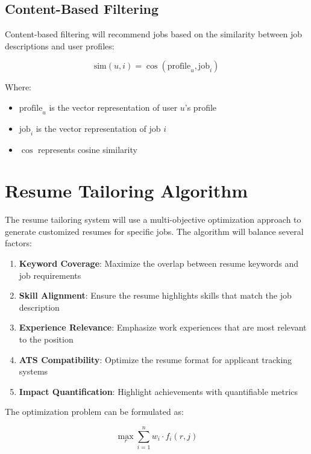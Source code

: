 \documentclass[12pt,a4paper]{report}
\begin{document}
\subsection*{Content-Based Filtering}

Content-based filtering will recommend jobs based on the similarity between job descriptions and user profiles:

\begin{equation}
    \text{sim}(u,i) = \cos(\text{profile}_u, \text{job}_i)
\end{equation}

Where:
\begin{itemize}
    \item $\text{profile}_u$ is the vector representation of user $u$'s profile
    \item $\text{job}_i$ is the vector representation of job $i$
    \item $\cos$ represents cosine similarity
\end{itemize}

\section*{Resume Tailoring Algorithm}

The resume tailoring system will use a multi-objective optimization approach to generate customized resumes for specific jobs. The algorithm will balance several factors:

\begin{enumerate}
    \item \textbf{Keyword Coverage}: Maximize the overlap between resume keywords and job requirements
    \item \textbf{Skill Alignment}: Ensure the resume highlights skills that match the job description
    \item \textbf{Experience Relevance}: Emphasize work experiences that are most relevant to the position
    \item \textbf{ATS Compatibility}: Optimize the resume format for applicant tracking systems
    \item \textbf{Impact Quantification}: Highlight achievements with quantifiable metrics
\end{enumerate}

The optimization problem can be formulated as:

\begin{equation}
    \max_{r} \sum_{i=1}^{n} w_i \cdot f_i(r, j)
\end{equation}
\end{document}
